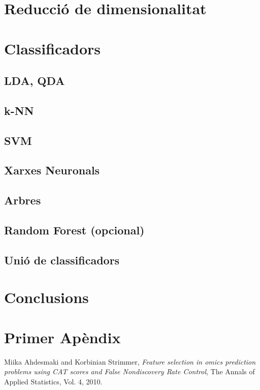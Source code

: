\documentclass[a4paper,10pt]{article}
\begin{document}
\section{Reducció de dimensionalitat}

\section{Classificadors}
\subsection{LDA, QDA}
\subsection{k-NN}
\subsection{SVM}
\subsection{Xarxes Neuronals}
\subsection{Arbres}
\subsection{Random Forest (opcional)}
\subsection{Unió de classificadors}
\section{Conclusions}


\appendix
\section{Primer Apèndix}

\begin{thebibliography}{9}


  Miika Ahdesmaki and Korbinian Strimmer,
  \emph{Feature selection in omics prediction problems using CAT scores and False Nondiscovery Rate Control},
  The Annals of Applied Statistics, 
  Vol. 4,
  2010.


\end{thebibliography}
\end{document}
